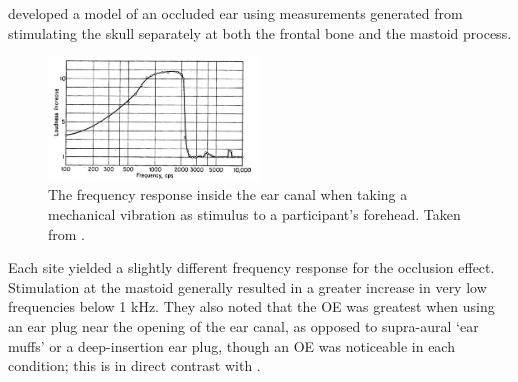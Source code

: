 \documentclass[dissertation,copyright]{uathesis}
\begin{document}
\cite{stenfelt:07} developed a model of an occluded ear using measurements generated from stimulating the skull separately at both the frontal bone and the mastoid process.
%
\begin{figure}
\includegraphics[width=0.5\textwidth]{figure/bekesy60-1.png}
\caption{The frequency response inside the ear canal when taking a mechanical vibration as stimulus to a participant's forehead.  Taken from \cite{bekesy:60}.}
\label{fig:bekesyOEresponse}
\end{figure}
%
Each site yielded a slightly different frequency response for the occlusion effect.  Stimulation at the mastoid generally resulted in a greater increase in very low frequencies below 1 kHz.  They also noted that the OE was greatest when using an ear plug near the opening of the ear canal, as opposed to supra-aural `ear muffs' or a deep-insertion ear plug, though an OE was noticeable in each condition; this is in direct contrast with \cite{dean:00}.   
%
\end{document}
